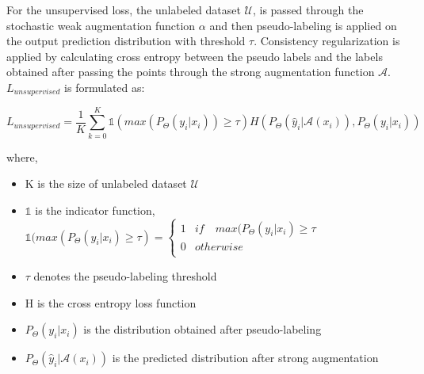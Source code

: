 For the unsupervised loss, the unlabeled dataset $\mathcal{U}$, is passed through the stochastic weak augmentation function $\alpha$ and then pseudo-labeling is applied on the output prediction distribution with threshold $\tau$. Consistency regularization is applied by calculating cross entropy between the pseudo labels and the labels obtained after passing the points through the strong augmentation function $\mathcal{A}$. $L_{unsupervised}$ is formulated as:

\begin{equation}
    \label{equation:fixmatch_unsupervised_loss}
    L_{unsupervised} = \frac{1}{K} \sum_{k=0}^{K} \mathbb{1}(max(P_{\Theta}(y_i | x_i)) \geq \tau) H(P_{\Theta}(\hat{y}_i | \mathcal{A}(x_i)), P_{\Theta}(y_i | x_i))
\end{equation}

where,
\begin{itemize}[label={}]
  \setlength\itemsep{0em}
  \item K is the size of unlabeled dataset $\mathcal{U}$
  \item $\mathbb{1}$ is the indicator function, $\mathbb{1}(max(P_{\Theta}(y_i | x_i) \geq \tau) = \begin{cases} 
      1 & if \quad max(P_{\Theta}(y_i | x_i) \geq \tau \\
      0 & otherwise \\
   \end{cases}$ 
   \item $\tau$ denotes the pseudo-labeling threshold 
   \item H is the cross entropy loss function
   \item $P_{\Theta}(y_i | x_i)$ is the distribution obtained after pseudo-labeling
   \item $P_{\Theta}(\hat{y}_i | \mathcal{A}(x_i))$ is the predicted distribution after strong augmentation
\end{itemize}

